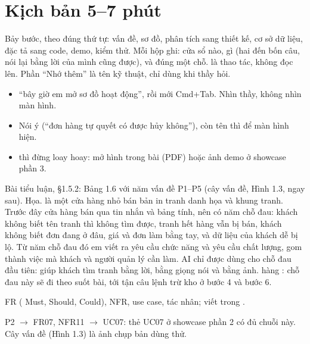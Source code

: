 \section{Kịch bản 5--7 phút}\label{sec:kichban}
Bảy bước, theo đúng thứ tự: vấn đề, sơ đồ, phân tích sang thiết kế, cơ sở dữ liệu, đặc tả sang code, demo, kiểm thử. Mỗi hộp ghi:  cửa sổ nào,  gì (hai đến bốn câu, nói lại bằng lời của mình cũng được), và  đúng một chỗ.  là thao tác, không đọc lên. Phần ``Nhớ thêm'' là tên kỹ thuật, chỉ dùng khi thầy hỏi.
\begin{itemize}
\item {} ``bây giờ em mở sơ đồ hoạt động'', rồi mới Cmd+Tab. Nhìn thầy, không nhìn màn hình.
\item {} Nói ý (``đơn hàng tự quyết có được hủy không''), còn tên thì để màn hình hiện.
\item {} thì đừng loay hoay: mở hình trong bài (PDF) hoặc ảnh demo ở showcase phần 3.
\end{itemize}

{Bài tiểu luận, §1.5.2: Bảng 1.6 với năm vấn đề P1--P5 (cây vấn đề, Hình 1.3, ngay sau).}
{Họa. là một cửa hàng nhỏ bán bản in tranh danh họa và khung tranh. Trước đây cửa hàng bán qua tin nhắn và bảng tính, nên có năm chỗ đau: khách không biết tên tranh thì không tìm được, tranh hết hàng vẫn bị bán, khách không biết đơn đang ở đâu, giá và đơn làm bằng tay, và dữ liệu của khách dễ bị lộ. Từ năm chỗ đau đó em viết ra \factFR{} yêu cầu chức năng và \factNFR{} yêu cầu chất lượng, gom thành \factUC{} việc mà khách và người quản lý cần làm. AI chỉ được dùng cho chỗ đau đầu tiên: giúp khách tìm tranh bằng lời, bằng giọng nói và bằng ảnh.}
{hàng : chỗ đau này sẽ đi theo suốt bài, tới tận câu lệnh trừ kho ở bước 4 và bước 6.}
{\item \factFR{} FR (\factMust{} Must, \factShould{} Should, \factCould{} Could), \factNFR{} NFR, \factUC{} use case, \factActors{} tác nhân; viết trong .
 \item P2 $\to$ FR07, NFR11 $\to$ UC07: thẻ UC07 ở showcase phần 2 có đủ chuỗi này. Cây vấn đề (Hình 1.3) là ảnh chụp bản dùng thử.}

